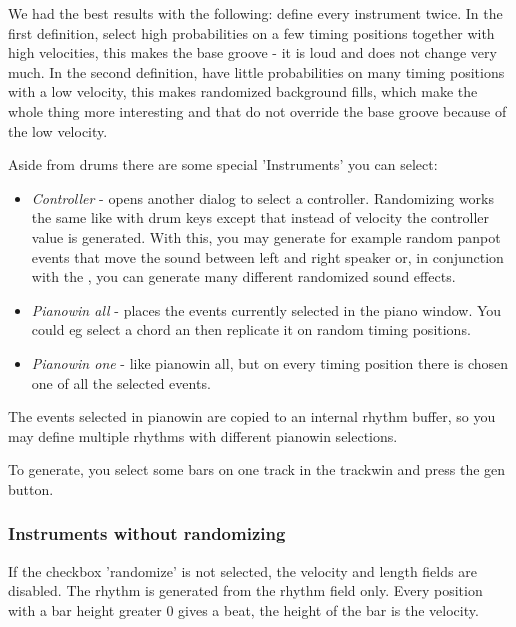 \documentclass[letterpaper]{report}
\begin{document}
We had the best results with the following: define every instrument
twice. In the first definition, select high probabilities on a few
timing positions together with high velocities, this makes the base
groove - it is loud and does not change very much. In the second
definition, have little probabilities on many timing positions with
a low velocity, this makes randomized background fills, which make the
whole thing more interesting and that do not override the base groove
because of the low velocity.

Aside from drums there are some special 'Instruments' you can select:

\begin{itemize}
\item {\em Controller} - opens another dialog to select a controller.
Randomizing works the same like with drum keys except that instead of
velocity the controller value is generated. With this, you may generate for
example random panpot events that move the sound between left and
right speaker or, in conjunction with the ,
you can generate many different randomized sound effects.
\item {\em Pianowin all} - places the events currently selected in the piano
window. You could eg select a chord an then replicate it on random timing
positions.
\item {\em Pianowin one} - like pianowin all, but on every timing position
there is chosen one of all the selected events.
\end{itemize}

The events selected in pianowin are copied to an internal rhythm buffer, so
you may define multiple rhythms with different pianowin selections.

To generate, you select some bars on one track in the trackwin and press the
gen button.



\subsubsection{Instruments without randomizing}

If the checkbox 'randomize' is not selected, the velocity and length
fields are disabled. The rhythm is generated from the rhythm field only.
Every position with a bar height greater 0 gives a beat, the height of
the bar is the velocity.
\end{document}
